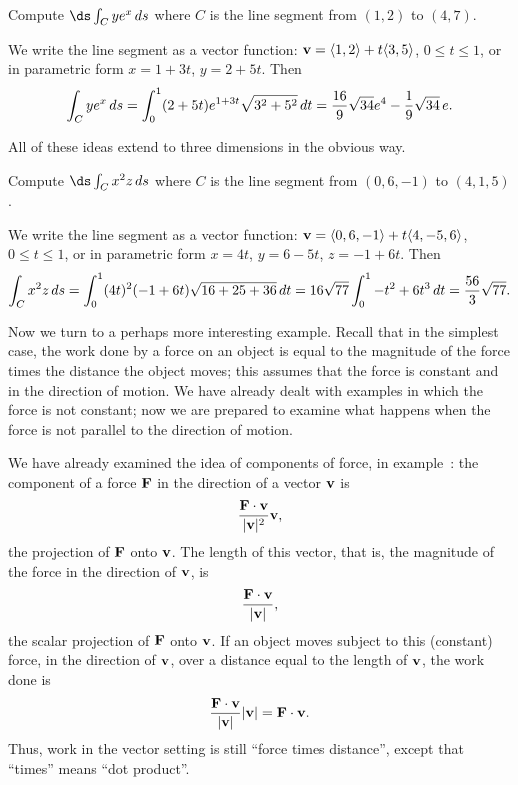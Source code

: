 \begin{example} Compute $\ds\int_C ye^x\,ds$ where $C$ is the line segment from
$(1,2)$ to $(4,7)$.

We write the line segment as a vector function: ${\bf v}=\langle
1,2\rangle + t\langle 3,5\rangle$, $0\le t\le 1$, or in parametric
form $x=1+3t$, $y=2+5t$. Then
$$\int_C ye^x\,ds = \int_0^1 (2+5t)e^{1+3t}\sqrt{3^2+5^2}\,dt
={16\over 9}\sqrt{34}e^4-{1\over9}\sqrt{34}\,e.
$$
\end{example}

All of these ideas extend to three dimensions in the obvious way.

\begin{example} Compute $\ds\int_C x^2  z \,ds$ where $C$ is the line segment
from $(0,6,-1)$ to $(4,1,5)$.

We write the line segment as a vector function: ${\bf v}=\langle
0,6,-1\rangle + t\langle 4,-5,6\rangle$, $0\le t\le 1$, or in parametric
form $x=4t$, $y=6-5t$, $z=-1+6t$. Then
$$\int_C x^2 z\,ds = \int_0^1 (4t)^2 (-1+6t)\sqrt{16+25+36}\,dt
=16\sqrt{77}\int_0^1 -t^2+6t^3\,dt={56\over3}\sqrt{77}.
$$
\end{example}

Now we turn to a perhaps more interesting example. Recall that in the
simplest case, the work done by a force on an object is equal to the
magnitude of the force times the distance the object moves; this
assumes that the force is constant and in the direction of motion. We
have already dealt with examples in which the force is not constant;
now we are prepared to examine what happens when the force is not
parallel to the direction of motion.

We have already examined the idea of components of force, in
example~: the component of a
force $\bf F$ in the direction of a vector $\bf v$ is 
$${{\bf F}\cdot {\bf v}\over|{\bf v}|^2}{\bf v},$$
the projection of $\bf F$ onto $\bf v$.
The length of this vector, that is, the magnitude of the force in the
direction of $\bf v$, is 
$${{\bf F}\cdot {\bf v}\over|{\bf v}|},$$
the scalar projection
 of $\bf F$ onto $\bf v$.
If an object moves subject to this (constant) force, in the direction
of $\bf v$, over a distance equal to the length of $\bf v$, the work
done is
$${{\bf F}\cdot {\bf v}\over|{\bf v}|}|{\bf v}|={\bf F}\cdot {\bf v}.$$
Thus, work in the vector setting is still ``force times distance'',
except that ``times'' means ``dot product''.


